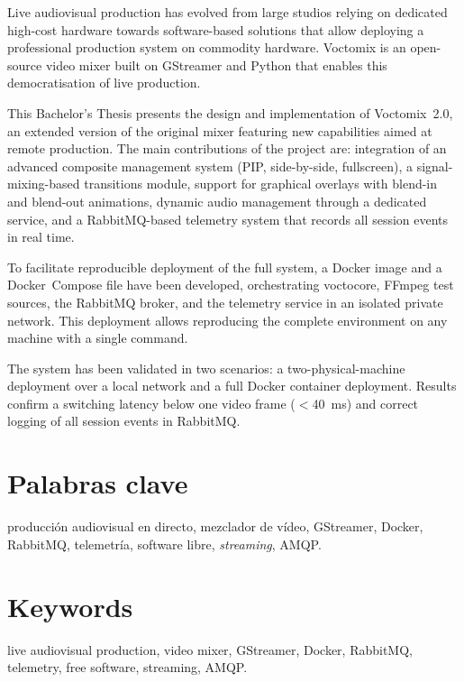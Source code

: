 Live audiovisual production has evolved from large studios relying on dedicated
high-cost hardware towards software-based solutions that allow deploying a
professional production system on commodity hardware. Voctomix is an open-source
video mixer built on GStreamer and Python that enables this democratisation of
live production.

This Bachelor's Thesis presents the design and implementation of Voctomix~2.0,
an extended version of the original mixer featuring new capabilities aimed at
remote production. The main contributions of the project are: integration of an
advanced composite management system (PIP, side-by-side, fullscreen), a
signal-mixing-based transitions module, support for graphical overlays with blend-in
and blend-out animations, dynamic audio management through a dedicated service, and
a RabbitMQ-based telemetry system that records all session events in real time.

To facilitate reproducible deployment of the full system, a Docker image and a
Docker~Compose file have been developed, orchestrating voctocore, FFmpeg test
sources, the RabbitMQ broker, and the telemetry service in an isolated private
network. This deployment allows reproducing the complete environment on any machine
with a single command.

The system has been validated in two scenarios: a two-physical-machine deployment
over a local network and a full Docker container deployment. Results confirm a
switching latency below one video frame ($<$40~ms) and correct logging of all
session events in RabbitMQ.

\chapter*{Palabras clave}

producción audiovisual en directo, mezclador de vídeo, GStreamer, Docker,
RabbitMQ, telemetría, software libre, \textit{streaming}, AMQP.

\chapter*{Keywords}

live audiovisual production, video mixer, GStreamer, Docker,
RabbitMQ, telemetry, free software, streaming, AMQP.

\newpage
